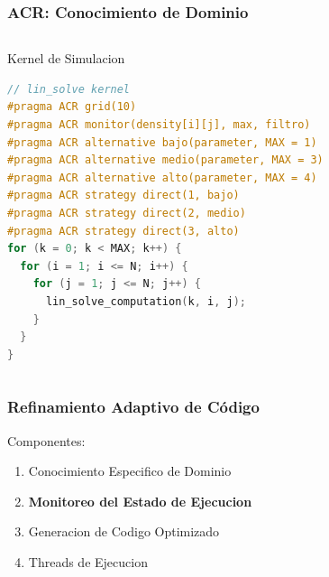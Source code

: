 \documentclass{beamer}\usetheme{Madrid} %
\begin{document}
\begin{frame}[fragile]
\frametitle{ACR: Conocimiento de Dominio}
\begin{columns}
\begin{block}{Kernel de Simulacion}
\begin{lstlisting}[basicstyle=\scriptsize,language=C]
// lin_solve kernel
#pragma ACR grid(10)
#pragma ACR monitor(density[i][j], max, filtro)
#pragma ACR alternative bajo(parameter, MAX = 1)
#pragma ACR alternative medio(parameter, MAX = 3)
#pragma ACR alternative alto(parameter, MAX = 4)
#pragma ACR strategy direct(1, bajo)
#pragma ACR strategy direct(2, medio)
#pragma ACR strategy direct(3, alto)
for (k = 0; k < MAX; k++) {
  for (i = 1; i <= N; i++) {
    for (j = 1; j <= N; j++) {
	  lin_solve_computation(k, i, j);
    } 
  }
}
\end{lstlisting}
\end{block}
\end{columns}
\end{frame}
\begin{frame}
\frametitle{Refinamiento Adaptivo de Código}
Componentes:
\begin{enumerate}
\item Conocimiento Especifico de Dominio
\item \textbf{Monitoreo del Estado de Ejecucion}
\item Generacion de Codigo Optimizado
\item Threads de Ejecucion
\end{enumerate}
\end{frame}
\end{document}
